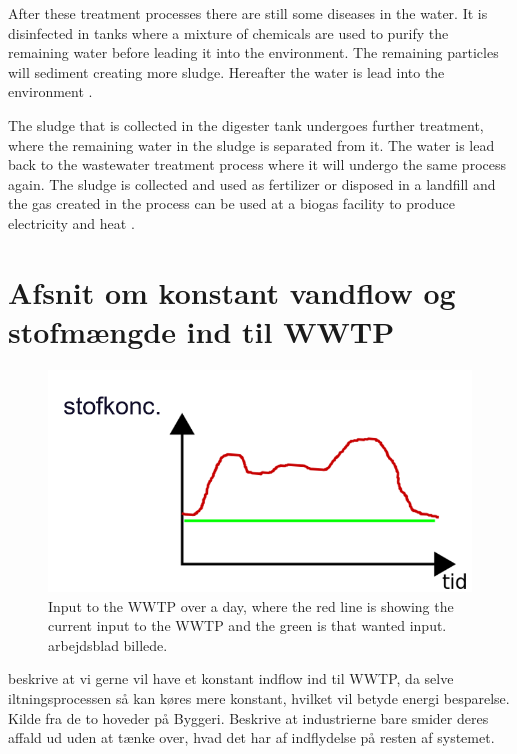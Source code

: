 After these treatment processes there are still some diseases in the water. It is disinfected in tanks where a mixture of chemicals are used to purify the remaining water before leading it into the environment. The remaining particles will sediment creating more sludge. Hereafter the water is lead into the environment \cite{youtube_wastewater}. 

The sludge that is collected in the digester tank undergoes further treatment, where the remaining water in the sludge is separated from it. The water is lead back to the wastewater treatment process where it will undergo the same process again. The sludge is collected and used as fertilizer or disposed in a landfill and the gas created in the process can be used at a biogas facility to produce electricity and heat \cite{wwtp_ekstra}.


\section{Afsnit om konstant vandflow og stofmængde ind til WWTP}


\begin{figure}[H]
\centering
\includegraphics[width=.6\textwidth]{report/introduction/pictures/input_to_wwtp.png}
\caption{Input to the WWTP over a day, where the red line is showing the current input to the WWTP and the green is that wanted input. arbejdsblad billede. }
\label{fig:input_to_wwtp}%
\end{figure} 


beskrive at vi gerne vil have et konstant indflow ind til WWTP, da selve iltningsprocessen så kan køres mere konstant, hvilket vil betyde energi besparelse. Kilde fra de to hoveder på Byggeri.
Beskrive at industrierne bare smider deres affald ud uden at tænke over, hvad det har af indflydelse på resten af systemet. 



